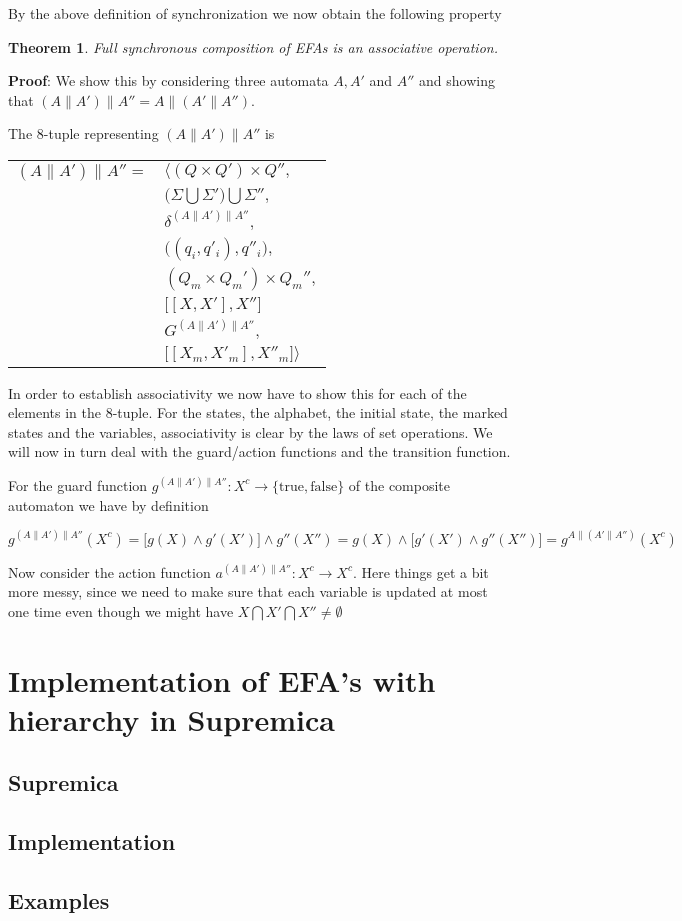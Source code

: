\documentclass{article}
\newtheorem{theorem}{Theorem}
\begin{document}
\noindent By the above definition of synchronization we now obtain
the following property

\begin{theorem}
   Full synchronous composition of EFAs is an associative
   operation.
\end{theorem}

\noindent \textbf{Proof}: We show this by considering three
automata $A, A'$ and $A''$ and showing that $(A\|A')\|A'' =
A\|(A'\|A'')$.

The 8-tuple representing $(A\|A')\|A''$ is

\begin{center}
\begin{tabular}{ll}
  $(A\|A')\|A'' =$ & $\Big \langle (Q \times Q') \times Q'',$\\
  & $ \big(\Sigma \bigcup \Sigma' \big) \bigcup \Sigma'',$\\
  & $\delta^{(A\|A')\|A''},$\\
  & $\big((q_i, q'_i) , q''_i\big),$\\
  & $(Q_m \times Q_m') \times Q_m'',$\\
  & $\big[[X, X'], X'']$\\
  & $G^{(A\|A')\|A''},$\\
  & $\big[[X_m, X'_m], X''_m \big] \Big \rangle$
\end{tabular}
\end{center}

\noindent In order to establish associativity we now have to show
this for each of the elements in the 8-tuple. For the states, the
alphabet, the initial state, the marked states and the variables,
associativity is clear by the laws of set operations. We will now
in turn deal with the guard/action functions and the transition
function.

For the guard function $g^{(A\|A')\|A''} : X^c \rightarrow
\{\mathrm{true}, \mathrm{false}\}$ of the composite automaton we
have by definition

\begin{equation}
  g^{(A\|A')\|A''}(X^c) = \big[g(X) \wedge g'(X') \big] \wedge g''(X'') = g(X) \wedge \big[g'(X') \wedge g''(X'')] = g^{A\|(A'\|A'')}(X^c)
\end{equation}

\noindent Now consider the action function $a^{(A\|A')\|A''} : X^c
\rightarrow X^c$. Here things get a bit more messy, since we need
to make sure that each variable is updated at most one time even
though we might have $X\bigcap X'\bigcap X'' \neq \emptyset$

\section{Implementation of EFA's with hierarchy in Supremica}

\subsection{Supremica}

\subsection{Implementation}\label{Implementation}
\subsection{Examples}
\end{document}
